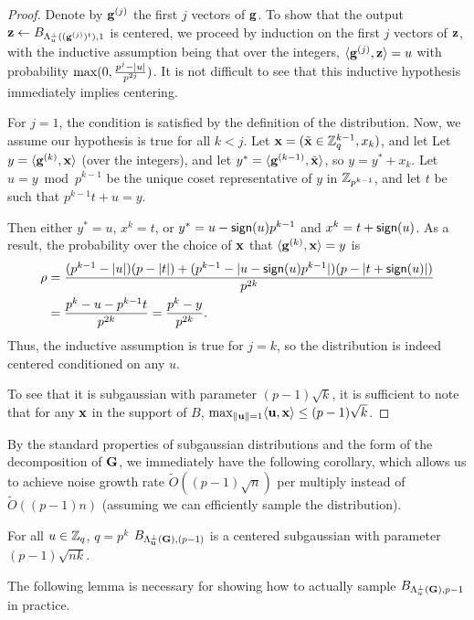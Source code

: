 \begin{proof}
Denote by $\mathbf{g}^{(j)}$ the first $j$ vectors of $\mathbf{g}$. 
To show that the output $\mathbf{z} \gets B_{\Lambda^{\perp}_{u}((\mathbf{g}^{(j)})^t),1}$ is centered, we proceed by
induction on the first $j$ vectors of $\mathbf{z}$, with the inductive
assumption being that over the integers,
$\langle\mathbf{g}^{(j)},\mathbf{z}\rangle=u$ with probability
$\max(0,\tfrac{p^j-\lvert u\rvert}{p^{2j}})$.
It is not difficult to see that this inductive hypothesis immediately
implies centering.

For $j=1$, the condition is satisfied by the definition of the
distribution.
Now, we assume our hypothesis is true for all $k < j$.
Let $\mathbf{x}=(\tilde{\mathbf{x}} \in \mathbb{Z}_q^{k-1}, x_k)$, and let 
Let $y=\langle\mathbf{g}^{(k)},\mathbf{x}\rangle$ (over the integers), and let 
$y^*=\langle\mathbf{g}^{(k-1)},\tilde{\mathbf{x}}\rangle$, so $y=y^*+x_k$. 
Let $u=y \bmod{p^{k-1}}$ be the unique coset representative of $y$ in
$\mathbb{Z}_{p^{k-1}}$, and let $t$ be such that $p^{k-1}t+u=y$. 

Then either $y^*=u$, $x^k=t$, or $y^*=u-\textsf{sign}(u)p^{k-1}$ and
$x^k=t+\textsf{sign}(u)$. 
As a result, the probability over the choice of $\mathbf{x}$ that
$\langle\mathbf{g}^{(k)},\mathbf{x}\rangle=y$ is
\begin{align*}
\rho&=\frac{(p^{k-1}-\lvert u\rvert)(p-\lvert t\rvert)+(p^{k-1}-\lvert u-\textsf{sign}(u)p^{k-1}\rvert)(p-\lvert t+\textsf{sign}(u)\rvert)}{p^{2k}}\\
&=\frac{p^k-u-p^{k-1}t}{p^{2k}}=\frac{p^{k}-y}{p^{2k}}.
\end{align*}
Thus, the inductive assumption is true for $j=k$, so
the distribution is indeed centered conditioned on any $u$. 

To see that it is subgaussian with parameter $(p-1)\sqrt{k}$, it is
sufficient to note that for any $\mathbf{x}$ in the support of $B$, $\max_{\lVert\mathbf{u}\rVert=1}\langle\mathbf{u},\mathbf{x}\rangle
\leq (p-1)\sqrt{k}$.
\end{proof}

By the standard properties of subgaussian distributions and the form
of the decomposition of $\mathbf{G}$, we immediately have the following corollary, which allows us to
achieve noise growth rate $\tilde{O}((p-1)\sqrt{n})$ per multiply instead
of $\tilde{O}((p-1)n)$ (assuming we can efficiently sample the distribution).
\begin{corollary}\label{cor:sampleGsub}
For all $u \in \mathbb{Z}_q$, $q=p^{k}$
$B_{\Lambda^{\perp}_{\mathbf{u}}(\mathbf{G}),(p-1)}$ is a centered subgaussian with parameter
$(p-1)\sqrt{nk}$.
\end{corollary}


The following lemma is necessary for showing how to actually sample $B_{\Lambda^{\perp}_{u}(\mathbf{G}),p-1}$ in
practice.

